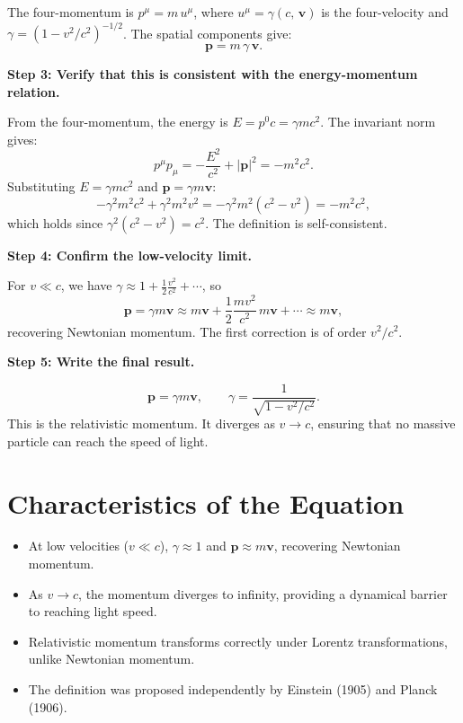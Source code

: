 The four-momentum is $p^\mu = m\,u^\mu$, where $u^\mu = \gamma(c,\,\mathbf{v})$ is the four-velocity and $\gamma = (1 - v^2/c^2)^{-1/2}$. The spatial components give:
\begin{equation}
\mathbf{p} = m\,\gamma\,\mathbf{v}.
\end{equation}

\textbf{Step 3: Verify that this is consistent with the energy-momentum relation.}

From the four-momentum, the energy is $E = p^0 c = \gamma mc^2$. The invariant norm gives:
\begin{equation}
p^\mu p_\mu = -\frac{E^2}{c^2} + |\mathbf{p}|^2 = -m^2c^2.
\end{equation}
Substituting $E = \gamma mc^2$ and $\mathbf{p} = \gamma m\mathbf{v}$:
\begin{equation}
-\gamma^2 m^2 c^2 + \gamma^2 m^2 v^2 = -\gamma^2 m^2(c^2 - v^2) = -m^2c^2,
\end{equation}
which holds since $\gamma^2(c^2 - v^2) = c^2$. The definition is self-consistent.

\textbf{Step 4: Confirm the low-velocity limit.}

For $v \ll c$, we have $\gamma \approx 1 + \frac{1}{2}\frac{v^2}{c^2} + \cdots$, so
\begin{equation}
\mathbf{p} = \gamma m\mathbf{v} \approx m\mathbf{v} + \frac{1}{2}\frac{mv^2}{c^2}\,m\mathbf{v} + \cdots \approx m\mathbf{v},
\end{equation}
recovering Newtonian momentum. The first correction is of order $v^2/c^2$.

\textbf{Step 5: Write the final result.}

\begin{equation}
\boxed{\mathbf{p} = \gamma m\mathbf{v}, \qquad \gamma = \frac{1}{\sqrt{1 - v^2/c^2}}.}
\end{equation}
This is the relativistic momentum. It diverges as $v \to c$, ensuring that no massive particle can reach the speed of light.

\section*{Characteristics of the Equation}

\begin{itemize}
    \item At low velocities ($v \ll c$), $\gamma \approx 1$ and $\mathbf{p} \approx m\mathbf{v}$, recovering Newtonian momentum.
    \item As $v \to c$, the momentum diverges to infinity, providing a dynamical barrier to reaching light speed.
    \item Relativistic momentum transforms correctly under Lorentz transformations, unlike Newtonian momentum.
    \item The definition was proposed independently by Einstein (1905) and Planck (1906).
\end{itemize}
